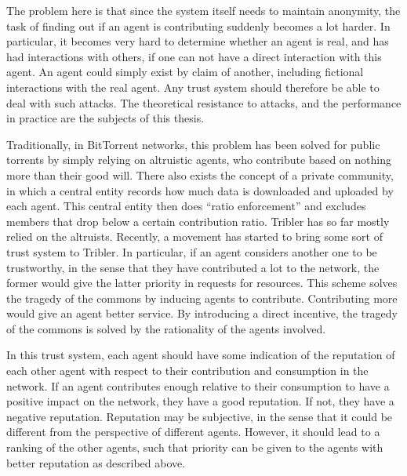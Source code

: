\documentclass[a4paper,11pt]{book}
\theoremstyle{definition}
\begin{document}
\addtocounter{footnote}{-1}
\addtocounter{footnote}{1}


The problem here is that since the system itself needs to maintain anonymity, the task of
finding out if an agent is contributing suddenly becomes a lot harder. In particular, 
it becomes very hard to determine whether an agent is real, and has had interactions with
others, if one can not have a direct interaction with this agent. An agent could simply
exist by claim of another, including fictional interactions with the real agent. Any trust system
should therefore be able to deal with such attacks. The theoretical resistance to attacks,
and the performance in practice are the subjects of this thesis.

Traditionally, in BitTorrent networks, this problem has been solved for public torrents
by simply relying on altruistic agents, who contribute based on nothing more than
their good will. There also exists the concept of a private community, in which a central
entity records how much data is downloaded and uploaded by each agent. This central
entity then does ``ratio enforcement'' and excludes members that drop below a certain
contribution ratio. Tribler has so far mostly relied on the altruists. 
Recently, a movement has started to bring some sort of trust system to Tribler. In particular,
if an agent considers another one to be trustworthy, in the sense that they have contributed
a lot to the network, the former would give the latter priority in requests for resources.
This scheme solves the tragedy of the commons by inducing agents to contribute. Contributing
more would give an agent better service. By introducing a direct incentive, the tragedy
of the commons is solved by the rationality of the agents involved.

In this trust system, each agent should have some indication of the reputation of each other agent
with respect to their contribution and consumption in the network. If an agent contributes
enough relative to their consumption to have a positive impact on the network, they have
a good reputation. If not, they have a negative reputation. Reputation may be subjective, in
the sense that it could be different from the perspective of different agents. However,
it should lead to a ranking of the other agents, such that priority can be given to the
agents with better reputation as described above. 
\end{document}
